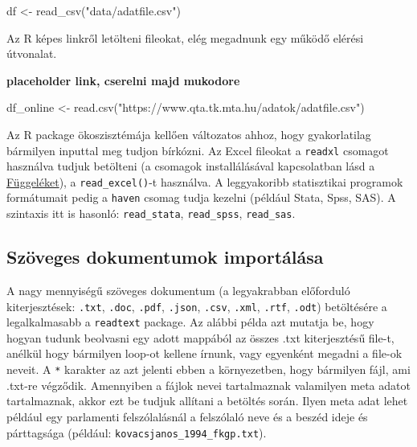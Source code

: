 \documentclass[
]{book}
\newenvironment{Shaded}{\begin{snugshade}}{\end{snugshade}}
\newcommand{\FunctionTok}[1]{\textcolor[rgb]{0.00,0.00,0.00}{#1}}
\newcommand{\NormalTok}[1]{#1}
\newcommand{\OtherTok}[1]{\textcolor[rgb]{0.56,0.35,0.01}{#1}}
\newcommand{\StringTok}[1]{\textcolor[rgb]{0.31,0.60,0.02}{#1}}
\begin{document}
\begin{Shaded}
\begin{Highlighting}[]
\NormalTok{df }\OtherTok{\textless{}{-}} \FunctionTok{read\_csv}\NormalTok{(}\StringTok{"data/adatfile.csv"}\NormalTok{)}
\end{Highlighting}
\end{Shaded}

Az R képes linkről letölteni fileokat, elég megadnunk egy működő elérési
útvonalat.

\textbf{placeholder link, cserelni majd mukodore}

\begin{Shaded}
\begin{Highlighting}[]
\NormalTok{df\_online }\OtherTok{\textless{}{-}} \FunctionTok{read.csv}\NormalTok{(}\StringTok{"https://www.qta.tk.mta.hu/adatok/adatfile.csv"}\NormalTok{)}
\end{Highlighting}
\end{Shaded}

Az R package ökoszisztémája kellően változatos ahhoz, hogy gyakorlatilag
bármilyen inputtal meg tudjon bírkózni. Az Excel fileokat a
\texttt{readxl} csomagot használva tudjuk betölteni (a csomagok
installálásával kapcsolatban lásd a
\protect\hyperlink{packages}{Függeléket}), a \texttt{read\_excel()}-t
használva. A leggyakoribb statisztikai programok formátumait pedig a
\texttt{haven} csomag tudja kezelni (például Stata, Spss, SAS). A
szintaxis itt is hasonló: \texttt{read\_stata}, \texttt{read\_spss},
\texttt{read\_sas}.

\hypertarget{szuxf6veges-dokumentumok-importuxe1luxe1sa}{%
\subsection{Szöveges dokumentumok
importálása}\label{szuxf6veges-dokumentumok-importuxe1luxe1sa}}

A nagy mennyiségű szöveges dokumentum (a legyakrabban előforduló
kiterjesztések: \texttt{.txt}, \texttt{.doc}, \texttt{.pdf},
\texttt{.json}, \texttt{.csv}, \texttt{.xml}, \texttt{.rtf},
\texttt{.odt}) betöltésére a legalkalmasabb a \texttt{readtext} package.
Az alábbi példa azt mutatja be, hogy hogyan tudunk beolvasni egy adott
mappából az összes .txt kiterjesztésű file-t, anélkül hogy bármilyen
loop-ot kellene írnunk, vagy egyenként megadni a file-ok neveit. A
\texttt{*} karakter az azt jelenti ebben a környezetben, hogy bármilyen
fájl, ami .txt-re végződik. Amennyiben a fájlok nevei tartalmaznak
valamilyen meta adatot tartalmaznak, akkor ezt be tudjuk allítani a
betöltés során. Ilyen meta adat lehet például egy parlamenti
felszólalásnál a felszólaló neve és a beszéd ideje és párttagsága
(például: \texttt{kovacsjanos\_1994\_fkgp.txt}).
\end{document}
